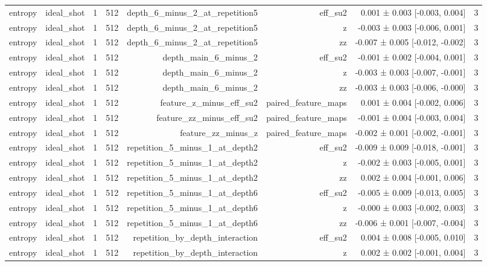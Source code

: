\begin{table}
\begin{tabular}{lrrrrrrr}
entropy & ideal\_shot & 1 & 512 & depth\_6\_minus\_2\_at\_repetition5 & eff\_su2 & 0.001 ± 0.003 [-0.003, 0.004] & 3 \\
entropy & ideal\_shot & 1 & 512 & depth\_6\_minus\_2\_at\_repetition5 & z & -0.003 ± 0.003 [-0.006, 0.001] & 3 \\
entropy & ideal\_shot & 1 & 512 & depth\_6\_minus\_2\_at\_repetition5 & zz & -0.007 ± 0.005 [-0.012, -0.002] & 3 \\
entropy & ideal\_shot & 1 & 512 & depth\_main\_6\_minus\_2 & eff\_su2 & -0.001 ± 0.002 [-0.004, 0.001] & 3 \\
entropy & ideal\_shot & 1 & 512 & depth\_main\_6\_minus\_2 & z & -0.003 ± 0.003 [-0.007, -0.001] & 3 \\
entropy & ideal\_shot & 1 & 512 & depth\_main\_6\_minus\_2 & zz & -0.003 ± 0.003 [-0.006, -0.000] & 3 \\
entropy & ideal\_shot & 1 & 512 & feature\_z\_minus\_eff\_su2 & paired\_feature\_maps & 0.001 ± 0.004 [-0.002, 0.006] & 3 \\
entropy & ideal\_shot & 1 & 512 & feature\_zz\_minus\_eff\_su2 & paired\_feature\_maps & -0.001 ± 0.004 [-0.003, 0.004] & 3 \\
entropy & ideal\_shot & 1 & 512 & feature\_zz\_minus\_z & paired\_feature\_maps & -0.002 ± 0.001 [-0.002, -0.001] & 3 \\
entropy & ideal\_shot & 1 & 512 & repetition\_5\_minus\_1\_at\_depth2 & eff\_su2 & -0.009 ± 0.009 [-0.018, -0.001] & 3 \\
entropy & ideal\_shot & 1 & 512 & repetition\_5\_minus\_1\_at\_depth2 & z & -0.002 ± 0.003 [-0.005, 0.001] & 3 \\
entropy & ideal\_shot & 1 & 512 & repetition\_5\_minus\_1\_at\_depth2 & zz & 0.002 ± 0.004 [-0.001, 0.006] & 3 \\
entropy & ideal\_shot & 1 & 512 & repetition\_5\_minus\_1\_at\_depth6 & eff\_su2 & -0.005 ± 0.009 [-0.013, 0.005] & 3 \\
entropy & ideal\_shot & 1 & 512 & repetition\_5\_minus\_1\_at\_depth6 & z & -0.000 ± 0.003 [-0.002, 0.003] & 3 \\
entropy & ideal\_shot & 1 & 512 & repetition\_5\_minus\_1\_at\_depth6 & zz & -0.006 ± 0.001 [-0.007, -0.004] & 3 \\
entropy & ideal\_shot & 1 & 512 & repetition\_by\_depth\_interaction & eff\_su2 & 0.004 ± 0.008 [-0.005, 0.010] & 3 \\
entropy & ideal\_shot & 1 & 512 & repetition\_by\_depth\_interaction & z & 0.002 ± 0.002 [-0.001, 0.004] & 3 \\

\end{tabular}
\end{table}
